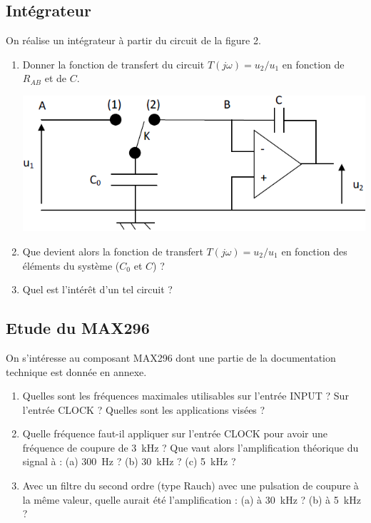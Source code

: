 \documentclass[a4paper,french]{paper}
\begin{document}
{\subsection*{Intégrateur}

On réalise un intégrateur à partir du circuit de la figure 2.

\begin{enumerate}
	\item Donner la fonction de transfert du circuit $T(j\omega) = u_2/u_1$ en fonction de $R_{AB}$ et de $C$.

\begin{center}
	\includegraphics{images/capa_comm_integrateur.png}
\end{center}

	\item Que devient alors la fonction de transfert $T(j\omega{}) = u_2/u_1$ en fonction des éléments du système ($C_0$ et $C$) ?
	\item Quel est l'intérêt d'un tel circuit ?
\end{enumerate}

\subsection*{Etude du MAX296}

On s'intéresse au composant MAX296 dont une partie de la documentation technique est donnée en annexe.

\begin{enumerate}
	\item Quelles sont les fréquences maximales utilisables sur l'entrée \textsc{INPUT} ? Sur l'entrée \textsc{CLOCK} ? Quelles sont les applications visées ?
	\item Quelle fréquence faut-il appliquer sur l'entrée \textsc{CLOCK} pour avoir une fréquence de coupure de 3~kHz ? Que vaut alors l'amplification théorique du signal à : (a) 300~Hz ? (b) 30~kHz ? (c) 5~kHz ?
	\item Avec un filtre du second ordre (type Rauch) avec une pulsation de coupure à la même valeur, quelle aurait été l'amplification : (a) à 30~kHz ? (b) à 5~kHz ?	
	
\end{enumerate}

}
\end{document}

